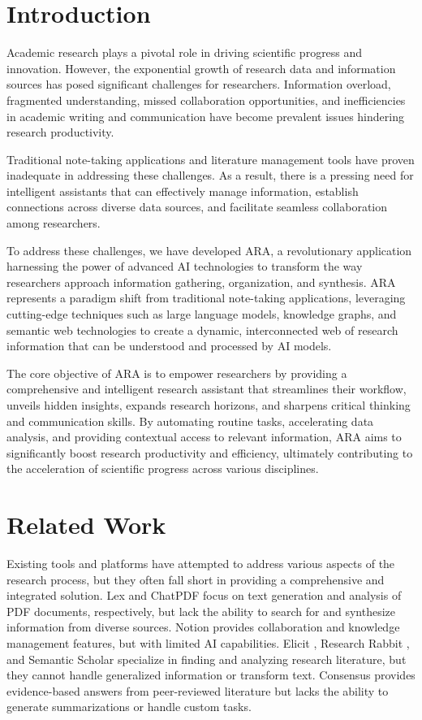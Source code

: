 \documentclass[a4paper,conference]{IEEEtran}
\begin{document}
\section{Introduction}
Academic research plays a pivotal role in driving scientific progress and innovation. However, the exponential growth of research data and information sources has posed significant challenges for researchers. Information overload, fragmented understanding, missed collaboration opportunities, and inefficiencies in academic writing and communication have become prevalent issues hindering research productivity.

Traditional note-taking applications and literature management tools have proven inadequate in addressing these challenges. As a result, there is a pressing need for intelligent assistants that can effectively manage information, establish connections across diverse data sources, and facilitate seamless collaboration among researchers.

To address these challenges, we have developed ARA, a revolutionary application harnessing the power of advanced AI technologies to transform the way researchers approach information gathering, organization, and synthesis. ARA represents a paradigm shift from traditional note-taking applications, leveraging cutting-edge techniques such as large language models, knowledge graphs, and semantic web technologies to create a dynamic, interconnected web of research information that can be understood and processed by AI models.

The core objective of ARA is to empower researchers by providing a comprehensive and intelligent research assistant that streamlines their workflow, unveils hidden insights, expands research horizons, and sharpens critical thinking and communication skills. By automating routine tasks, accelerating data analysis, and providing contextual access to relevant information, ARA aims to significantly boost research productivity and efficiency, ultimately contributing to the acceleration of scientific progress across various disciplines.

\section{Related Work}
Existing tools and platforms have attempted to address various aspects of the research process, but they often fall short in providing a comprehensive and integrated solution. Lex \cite{lex} and ChatPDF \cite{chatpdf} focus on text generation and analysis of PDF documents, respectively, but lack the ability to search for and synthesize information from diverse sources. Notion \cite{notion} provides collaboration and knowledge management features, but with limited AI capabilities. Elicit \cite{elicit}, Research Rabbit \cite{researchrabbit}, and Semantic Scholar \cite{semanticscholar} specialize in finding and analyzing research literature, but they cannot handle generalized information or transform text. Consensus \cite{consensus} provides evidence-based answers from peer-reviewed literature but lacks the ability to generate summarizations or handle custom tasks.
\end{document}
